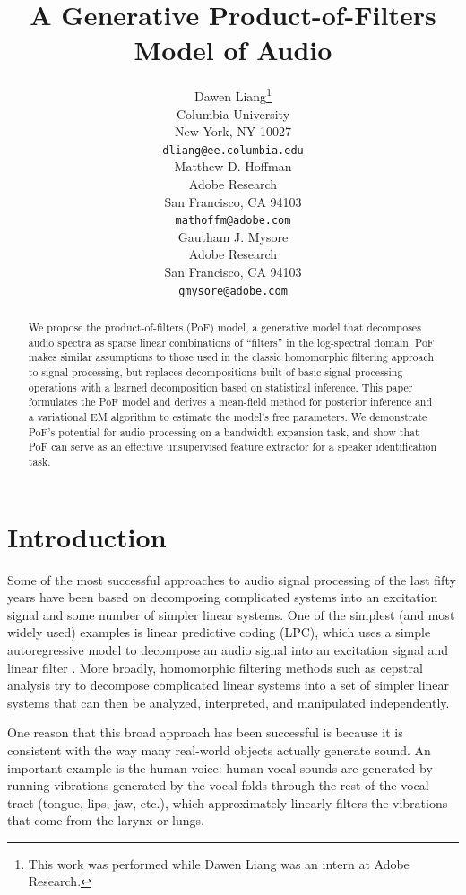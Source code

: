 \documentclass{article} %
\title{A Generative Product-of-Filters Model of Audio}
\author{
Dawen Liang\thanks{ This work was performed while Dawen Liang was an intern at Adobe Research.} \\
Columbia University\\
New York, NY 10027\\
\texttt{dliang@ee.columbia.edu} \\
\And
Matthew D. Hoffman \\
Adobe Research \\
San Francisco, CA 94103\\
\texttt{mathoffm@adobe.com} \\
\And
Gautham J. Mysore \\
Adobe Research \\
San Francisco, CA 94103\\
\texttt{gmysore@adobe.com} \\
}
\begin{document}
\maketitle

\begin{abstract}
We propose the product-of-filters (PoF) model, a generative model that
decomposes audio spectra as sparse linear combinations of ``filters''
in the log-spectral domain. PoF makes similar assumptions to those used
in the classic homomorphic filtering approach to signal processing,
but replaces decompositions built of basic signal
processing operations with a learned decomposition based on
statistical inference. This paper formulates the PoF model and derives
a mean-field method for posterior inference and a variational EM
algorithm to estimate the model's free parameters. We demonstrate PoF's
potential for audio processing on a bandwidth expansion task, and show
that PoF can serve as an effective unsupervised feature extractor for a
speaker identification task.
\end{abstract}

\section{Introduction}
Some of the most successful approaches to audio signal processing of
the last fifty years have been based on decomposing complicated systems
into an excitation signal and some number of simpler linear systems.
One of the simplest (and most widely used) examples is linear
predictive coding (LPC), which uses a simple autoregressive model to
decompose an audio signal into an excitation
signal and linear filter \cite{lpc}. More broadly, homomorphic filtering methods
 such as cepstral analysis \cite{oppenheim1968homomorphic}
try to decompose complicated linear systems into a set of simpler
linear systems that can then be analyzed, interpreted, and manipulated
independently.

One reason that this broad approach has been successful is because it is consistent with
the way many real-world objects actually generate sound. An important
example is the human voice: human vocal sounds are generated by
running vibrations generated by the vocal folds through the rest of
the vocal tract (tongue, lips, jaw, etc.), which approximately linearly filters the
vibrations that come from the larynx or lungs.
\end{document}
